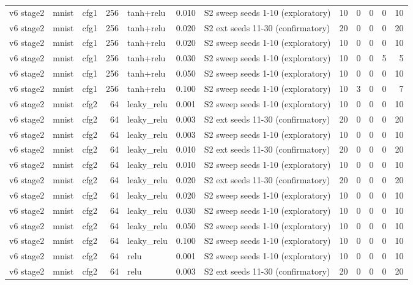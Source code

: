 \begin{table}[htbp]
{\begin{tabular}{@{}lllrlrlrrrrr@{}}
v6 stage2 & mnist & cfg1 & 256 & tanh+relu & 0.010 & S2 sweep seeds 1-10 (exploratory) & 10 & 0 & 0 & 0 & 10 \\
v6 stage2 & mnist & cfg1 & 256 & tanh+relu & 0.020 & S2 ext seeds 11-30 (confirmatory) & 20 & 0 & 0 & 0 & 20 \\
v6 stage2 & mnist & cfg1 & 256 & tanh+relu & 0.020 & S2 sweep seeds 1-10 (exploratory) & 10 & 0 & 0 & 0 & 10 \\
v6 stage2 & mnist & cfg1 & 256 & tanh+relu & 0.030 & S2 sweep seeds 1-10 (exploratory) & 10 & 0 & 0 & 5 & 5 \\
v6 stage2 & mnist & cfg1 & 256 & tanh+relu & 0.050 & S2 sweep seeds 1-10 (exploratory) & 10 & 0 & 0 & 0 & 10 \\
v6 stage2 & mnist & cfg1 & 256 & tanh+relu & 0.100 & S2 sweep seeds 1-10 (exploratory) & 10 & 3 & 0 & 0 & 7 \\
v6 stage2 & mnist & cfg2 & 64 & leaky\_relu & 0.001 & S2 sweep seeds 1-10 (exploratory) & 10 & 0 & 0 & 0 & 10 \\
v6 stage2 & mnist & cfg2 & 64 & leaky\_relu & 0.003 & S2 ext seeds 11-30 (confirmatory) & 20 & 0 & 0 & 0 & 20 \\
v6 stage2 & mnist & cfg2 & 64 & leaky\_relu & 0.003 & S2 sweep seeds 1-10 (exploratory) & 10 & 0 & 0 & 0 & 10 \\
v6 stage2 & mnist & cfg2 & 64 & leaky\_relu & 0.010 & S2 ext seeds 11-30 (confirmatory) & 20 & 0 & 0 & 0 & 20 \\
v6 stage2 & mnist & cfg2 & 64 & leaky\_relu & 0.010 & S2 sweep seeds 1-10 (exploratory) & 10 & 0 & 0 & 0 & 10 \\
v6 stage2 & mnist & cfg2 & 64 & leaky\_relu & 0.020 & S2 ext seeds 11-30 (confirmatory) & 20 & 0 & 0 & 0 & 20 \\
v6 stage2 & mnist & cfg2 & 64 & leaky\_relu & 0.020 & S2 sweep seeds 1-10 (exploratory) & 10 & 0 & 0 & 0 & 10 \\
v6 stage2 & mnist & cfg2 & 64 & leaky\_relu & 0.030 & S2 sweep seeds 1-10 (exploratory) & 10 & 0 & 0 & 0 & 10 \\
v6 stage2 & mnist & cfg2 & 64 & leaky\_relu & 0.050 & S2 sweep seeds 1-10 (exploratory) & 10 & 0 & 0 & 0 & 10 \\
v6 stage2 & mnist & cfg2 & 64 & leaky\_relu & 0.100 & S2 sweep seeds 1-10 (exploratory) & 10 & 0 & 0 & 0 & 10 \\
v6 stage2 & mnist & cfg2 & 64 & relu & 0.001 & S2 sweep seeds 1-10 (exploratory) & 10 & 0 & 0 & 0 & 10 \\
v6 stage2 & mnist & cfg2 & 64 & relu & 0.003 & S2 ext seeds 11-30 (confirmatory) & 20 & 0 & 0 & 0 & 20 \\

\end{tabular}}
\end{table}
